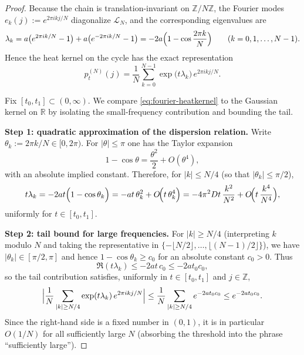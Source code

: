 \documentclass[11pt]{amsart}
\theoremstyle{definition}
\theoremstyle{remark}
\newcommand{\Z}{\mathbb{Z}}
\newcommand{\R}{\mathbb{R}}
\begin{document}
\begin{proof}
Because the chain is translation-invariant on $\Z/N\Z$, the Fourier modes
$e_k(j):=e^{2\pi i k j/N}$ diagonalize $\mathcal L_N$, and the corresponding eigenvalues are
\[
\lambda_k
=
a\bigl(e^{2\pi i k/N}-1\bigr)+a\bigl(e^{-2\pi i k/N}-1\bigr)
=
-2a\Bigl(1-\cos\frac{2\pi k}{N}\Bigr)
\qquad (k=0,1,\dots,N-1).
\]
Hence the heat kernel on the cycle has the exact representation
\begin{equation}\label{eq:fourier-heatkernel}
p_t^{(N)}(j)
=
\frac{1}{N}\sum_{k=0}^{N-1}\exp\!\bigl(t\lambda_k\bigr)\,e^{2\pi i k j/N}.
\end{equation}

Fix $[t_0,t_1]\subset(0,\infty)$. We compare \eqref{eq:fourier-heatkernel} to the Gaussian
kernel on $\R$ by isolating the small-frequency contribution and bounding the tail.

\smallskip
\noindent\textbf{Step 1: quadratic approximation of the dispersion relation.}
Write $\theta_k:=2\pi k/N\in[0,2\pi)$. For $|\theta|\le \pi$ one has the Taylor expansion
\[
1-\cos\theta=\frac{\theta^2}{2}+O(\theta^4),
\]
with an absolute implied constant. Therefore, for $|k|\le N/4$ (so that $|\theta_k|\le \pi/2$),
\begin{equation}\label{eq:dispersion-approx}
t\lambda_k
=
-2a t\Bigl(1-\cos\theta_k\Bigr)
=
-a t\,\theta_k^2 + O\!\Bigl(t\,\theta_k^4\Bigr)
=
-4\pi^2 D t\,\frac{k^2}{N^2}+O\!\Bigl(t\,\frac{k^4}{N^4}\Bigr),
\end{equation}
uniformly for $t\in[t_0,t_1]$.

\smallskip
\noindent\textbf{Step 2: tail bound for large frequencies.}
For $|k|\ge N/4$ (interpreting $k$ modulo $N$ and taking the representative in
$\{-\lfloor N/2\rfloor,\dots,\lfloor (N-1)/2\rfloor\}$), we have $|\theta_k|\in[\pi/2,\pi]$ and
hence $1-\cos\theta_k\ge c_0$ for an absolute constant $c_0>0$. Thus
\[
\Re(t\lambda_k)\le -2a t\,c_0 \le -2a t_0 c_0,
\]
so the tail contribution satisfies, uniformly in $t\in[t_0,t_1]$ and $j\in\Z$,
\begin{equation}\label{eq:tail}
\Bigl|\frac{1}{N}\sum_{|k|\ge N/4}\exp(t\lambda_k)\,e^{2\pi i k j/N}\Bigr|
\le
\frac{1}{N}\sum_{|k|\ge N/4}e^{-2a t_0 c_0}
\le
e^{-2a t_0 c_0}.
\end{equation}
Since the right-hand side is a fixed number in $(0,1)$, it is in particular $O(1/N)$ for
all sufficiently large $N$ (absorbing the threshold into the phrase ``sufficiently large'').


\end{proof}
\end{document}
